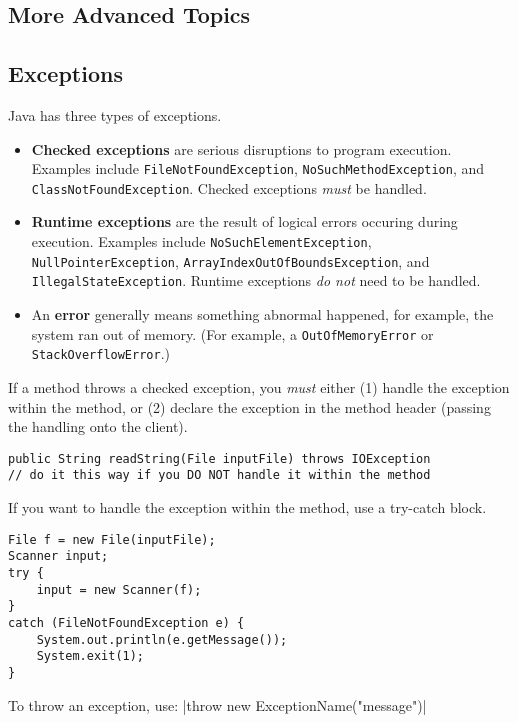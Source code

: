 \documentclass{article}
\begin{document}
\begin{flushleft}
\section{More Advanced Topics}

\subsection{Exceptions}

Java has three types of exceptions.

\begin{itemize}
    \item \textbf{Checked exceptions} are serious disruptions to program execution. Examples include \texttt{FileNotFoundException}, \texttt{NoSuchMethodException}, and \texttt{ClassNotFoundException}. Checked exceptions \textit{must} be handled.
    \item \textbf{Runtime exceptions} are the result of logical errors occuring during execution. Examples include \texttt{NoSuchElementException}, \texttt{NullPointerException}, \texttt{ArrayIndexOutOfBoundsException}, and \texttt{IllegalStateException}. Runtime exceptions \textit{do not} need to be handled.
    \item An \textbf{error} generally means something abnormal happened, for example, the system ran out of memory. (For example, a \texttt{OutOfMemoryError} or \texttt{StackOverflowError}.)
\end{itemize}

If a method throws a checked exception, you \textit{must} either (1) handle the exception within the method, or (2) declare the exception in the method header (passing the handling onto the client).

\begin{verbatim}
public String readString(File inputFile) throws IOException
// do it this way if you DO NOT handle it within the method
\end{verbatim}

If you want to handle the exception within the method, use a try-catch block.

\begin{verbatim}
File f = new File(inputFile);
Scanner input;
try {
    input = new Scanner(f);
}
catch (FileNotFoundException e) {
    System.out.println(e.getMessage());
    System.exit(1);
}
\end{verbatim}

To throw an exception, use: |throw new ExceptionName("message")|


\end{flushleft}
\end{document}
